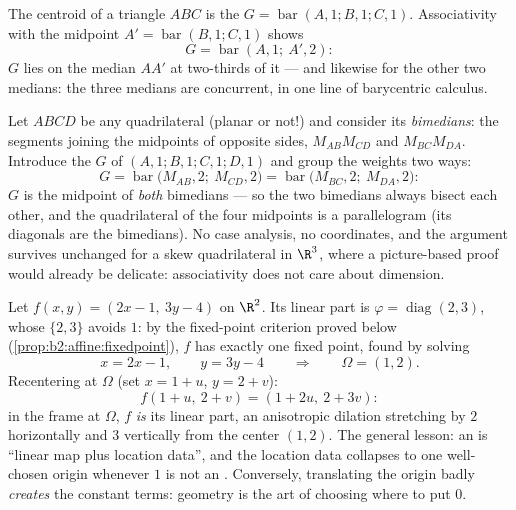 \begin{example}\label{ex:b2:affine:median}
The centroid of a triangle $ABC$ is the  $G =
\operatorname{bar}(A,1; B,1; C,1)$. Associativity with the
midpoint $A' = \operatorname{bar}(B, 1; C, 1)$ shows
\[
G = \operatorname{bar}(A, 1;\ A', 2) :
\]
$G$ lies on the median $AA'$ at two-thirds of it --- and likewise
for the other two medians: the three medians are concurrent, in
one line of barycentric calculus.
\end{example}

\begin{example}\label{ex:b2:affine:bimedians}
Let $ABCD$ be any quadrilateral (planar or not!) and consider
its \emph{bimedians}: the segments joining the midpoints of
opposite sides, $M_{AB}M_{CD}$ and $M_{BC}M_{DA}$. Introduce
the  $G$ of $(A,1; B,1; C,1; D,1)$ and group the
weights two ways:
\[
G = \operatorname{bar}\bigl(M_{AB}, 2;\ M_{CD}, 2\bigr)
= \operatorname{bar}\bigl(M_{BC}, 2;\ M_{DA}, 2\bigr) :
\]
$G$ is the midpoint of \emph{both} bimedians --- so the two
bimedians always bisect each other, and the quadrilateral of
the four midpoints is a parallelogram (its diagonals are the
bimedians). No case analysis, no coordinates, and the
argument survives unchanged for a skew quadrilateral in
$\R^3$, where a picture-based proof would already be
delicate: associativity does not care about dimension.
\end{example}

\begin{example}\label{ex:b2:affine:dilation}
Let $f(x, y) = (2x - 1,\ 3y - 4)$ on $\R^2$. Its linear part
is $\varphi = \operatorname{diag}(2, 3)$, whose 
$\{2, 3\}$ avoids $1$: by the fixed-point criterion proved
below (\cref{prop:b2:affine:fixedpoint}), $f$ has exactly one
fixed point, found by solving
\[
x = 2x - 1, \qquad y = 3y - 4
\qquad\Longrightarrow\qquad \Omega = (1, 2).
\]
Recentering at $\Omega$ (set $x = 1 + u$, $y = 2 + v$):
\[
f(1 + u,\ 2 + v) = (1 + 2u,\ 2 + 3v) :
\]
in the frame at $\Omega$, $f$ \emph{is} its linear part, an
anisotropic dilation stretching by $2$ horizontally and $3$
vertically from the center $(1, 2)$. The general lesson: an
 is ``linear map plus location data'', and the
location data collapses to one well-chosen origin whenever
$1$ is not an . Conversely, translating the origin
badly \emph{creates} the constant terms:  geometry is
the art of choosing where to put $0$.
\end{example}

